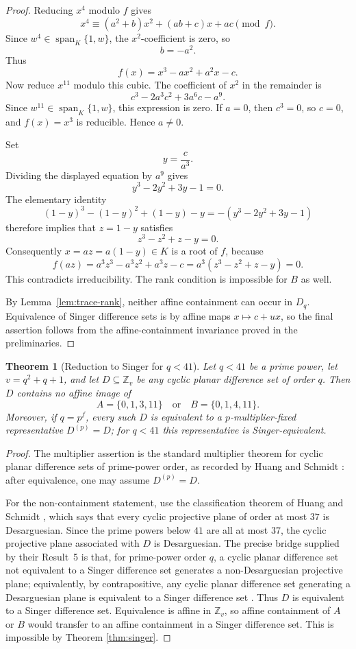 \documentclass[11pt,letterpaper]{amsart}
\theoremstyle{plain}
\newtheorem{theorem}{Theorem}[section]
\newcommand{\Z}{\mathbb Z}
\newcommand{\Span}{\operatorname{span}}
\begin{document}
\begin{proof}
Reducing \(x^4\) modulo \(f\) gives
\[
 x^4\equiv (a^2+b)x^2+(ab+c)x+ac \pmod f.
\]
Since \(w^4\in\Span_K\{1,w\}\), the \(x^2\)-coefficient is zero, so
\[
 b=-a^2.
\]
Thus
\[
 f(x)=x^3-ax^2+a^2x-c.
\]
Now reduce \(x^{11}\) modulo this cubic.  The coefficient of \(x^2\) in
the remainder is
\[
 c^3-2a^3c^2+3a^6c-a^9.
\]
Since \(w^{11}\in\Span_K\{1,w\}\), this expression is zero.  If
\(a=0\), then \(c^3=0\), so \(c=0\), and \(f(x)=x^3\) is reducible.
Hence \(a\ne0\).

Set
\[
 y=\frac{c}{a^3}.
\]
Dividing the displayed equation by \(a^9\) gives
\[
 y^3-2y^2+3y-1=0.
\]
The elementary identity
\[
 (1-y)^3-(1-y)^2+(1-y)-y
 =-(y^3-2y^2+3y-1)
\]
therefore implies that \(z=1-y\) satisfies
\[
 z^3-z^2+z-y=0.
\]
Consequently \(x=az=a(1-y)\in K\) is a root of \(f\), because
\[
 f(az)
 =a^3z^3-a^3z^2+a^3z-c
 =a^3(z^3-z^2+z-y)=0.
\]
This contradicts irreducibility.  The rank condition is impossible for
\(B\) as well.

By Lemma~\ref{lem:trace-rank}, neither affine containment can occur in
\(D_q\).  Equivalence of Singer difference sets is by affine maps
\(x\mapsto c+ux\), so the final assertion follows from the
affine-containment invariance proved in the preliminaries.
\end{proof}

\begin{theorem}[Reduction to Singer for \(q<41\)]
\label{thm:smallq}
Let \(q<41\) be a prime power, let \(v=q^2+q+1\), and let
\(D\subseteq \Z_v\) be any cyclic planar difference set of order \(q\).
Then \(D\) contains no affine image of
\[
 A=\{0,1,3,11\}
 \quad\text{or}\quad
 B=\{0,1,4,11\}.
\]
Moreover, if \(q=p^f\), every such \(D\) is equivalent to a
\(p\)-multiplier-fixed representative \(D^{(p)}=D\); for \(q<41\) this
representative is Singer-equivalent.
\end{theorem}

\begin{proof}
The multiplier assertion is the standard multiplier theorem for cyclic
planar difference sets of prime-power order, as recorded by Huang and
Schmidt \cite[Result 4]{HuangSchmidt}: after equivalence, one may assume
\(D^{(p)}=D\).

For the non-containment statement, use the classification theorem of
Huang and Schmidt \cite[Theorem 28]{HuangSchmidt}, which says that every
cyclic projective plane of order at most \(37\) is Desarguesian.  Since
the prime powers below \(41\) are all at most \(37\), the cyclic
projective plane associated with \(D\) is Desarguesian.  The precise
bridge supplied by their Result~5 is that, for prime-power order \(q\),
a cyclic planar difference set not equivalent to a Singer difference set
generates a non-Desarguesian projective plane; equivalently, by
contrapositive, any cyclic planar difference set generating a
Desarguesian plane is equivalent to a Singer difference set
\cite[Result 5]{HuangSchmidt}.  Thus \(D\) is equivalent to a Singer
difference set.  Equivalence is affine in \(\Z_v\), so affine
containment of \(A\) or \(B\) would transfer to an affine containment in
a Singer difference set.  This is impossible by Theorem
\ref{thm:singer}.
\end{proof}
\end{document}
